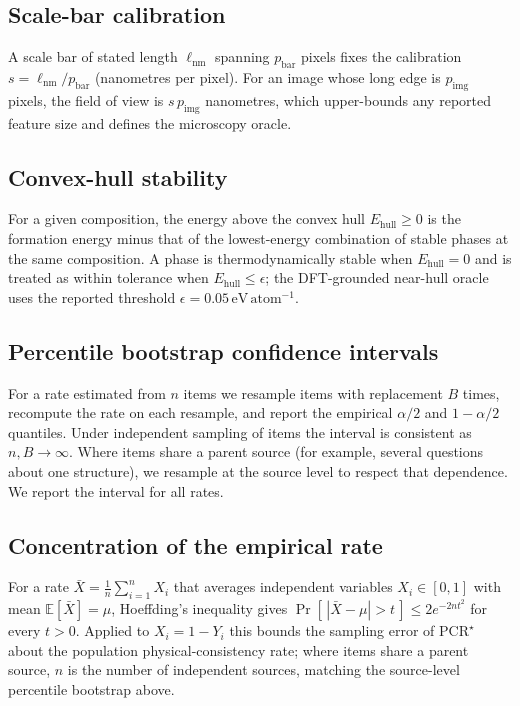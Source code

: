 \documentclass[11pt,a4paper]{article}
\begin{document}
\subsection{Scale-bar calibration}
A scale bar of stated length $\ell_{\mathrm{nm}}$ spanning $p_{\mathrm{bar}}$ pixels
fixes the calibration $s=\ell_{\mathrm{nm}}/p_{\mathrm{bar}}$ (nanometres per pixel).
For an image whose long edge is $p_{\mathrm{img}}$ pixels, the field of view is
$s\,p_{\mathrm{img}}$ nanometres, which upper-bounds any reported feature size and
defines the microscopy oracle.

\subsection{Convex-hull stability}
For a given composition, the energy above the convex hull $E_{\mathrm{hull}}\ge0$ is the
formation energy minus that of the lowest-energy combination of stable phases at the
same composition. A phase is thermodynamically stable when $E_{\mathrm{hull}}=0$ and is
treated as within tolerance when $E_{\mathrm{hull}}\le\epsilon$; the DFT-grounded near-hull oracle uses the reported threshold
$\epsilon=0.05\,\mathrm{eV\,atom^{-1}}$.

\subsection{Percentile bootstrap confidence intervals}
For a rate estimated from $n$ items we resample items with replacement $B$ times,
recompute the rate on each resample, and report the empirical $\alpha/2$ and
$1-\alpha/2$ quantiles. Under independent sampling of items the interval is consistent
as $n,B\to\infty$. Where items share a parent source (for example, several questions
about one structure), we resample at the source level to respect that dependence. We
report the interval for all rates.

\subsection{Concentration of the empirical rate}
For a rate $\bar X=\frac1n\sum_{i=1}^n X_i$ that averages independent variables
$X_i\in[0,1]$ with mean $\mathbb{E}[\bar X]=\mu$, Hoeffding's inequality gives
$\Pr[\,|\bar X-\mu|>t\,]\le 2e^{-2nt^2}$ for every $t>0$. Applied to $X_i=1-Y_i$ this
bounds the sampling error of $\mathrm{PCR}^\star$ about the population physical-consistency rate; where items share a parent source, $n$ is the number of independent sources, matching the source-level percentile bootstrap above.
\end{document}
